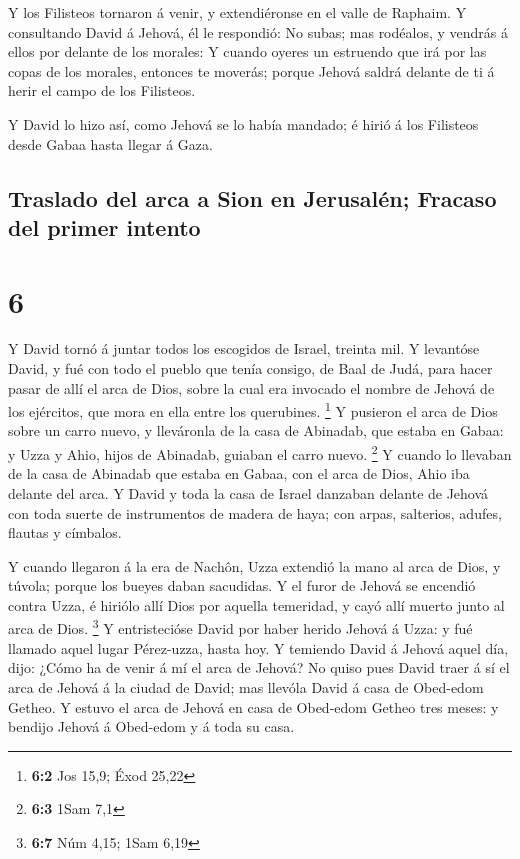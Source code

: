  Y los Filisteos tornaron á venir, y extendiéronse en el
valle de Raphaim.  Y consultando David á Jehová, él le
respondió: No subas; mas rodéalos, y vendrás á ellos por delante de los
morales:  Y cuando oyeres un estruendo que irá por las
copas de los morales, entonces te moverás; porque Jehová saldrá delante
de ti á herir el campo de los Filisteos.

 Y David lo hizo así, como Jehová se lo había mandado; é
hirió á los Filisteos desde Gabaa hasta llegar á Gaza.

\hypertarget{traslado-del-arca-a-sion-en-jerusaluxe9n-fracaso-del-primer-intento}{%
\subsection{Traslado del arca a Sion en Jerusalén; Fracaso del primer
intento}\label{traslado-del-arca-a-sion-en-jerusaluxe9n-fracaso-del-primer-intento}}

\hypertarget{section-5}{%
\section{6}\label{section-5}}

 Y David tornó á juntar todos los escogidos de Israel,
treinta mil.  Y levantóse David, y fué con todo el pueblo
que tenía consigo, de Baal de Judá, para hacer pasar de allí el arca de
Dios, sobre la cual era invocado el nombre de Jehová de los ejércitos,
que mora en ella entre los querubines. \footnote{\textbf{6:2} Jos 15,9;
  Éxod 25,22}  Y pusieron el arca de Dios sobre un carro
nuevo, y lleváronla de la casa de Abinadab, que estaba en Gabaa: y Uzza
y Ahio, hijos de Abinadab, guiaban el carro nuevo. \footnote{\textbf{6:3}
  1Sam 7,1}  Y cuando lo llevaban de la casa de Abinadab
que estaba en Gabaa, con el arca de Dios, Ahio iba delante del arca.
 Y David y toda la casa de Israel danzaban delante de
Jehová con toda suerte de instrumentos de madera de haya; con arpas,
salterios, adufes, flautas y címbalos.

 Y cuando llegaron á la era de Nachôn, Uzza extendió la
mano al arca de Dios, y túvola; porque los bueyes daban sacudidas.
 Y el furor de Jehová se encendió contra Uzza, é hiriólo
allí Dios por aquella temeridad, y cayó allí muerto junto al arca de
Dios. \footnote{\textbf{6:7} Núm 4,15; 1Sam 6,19}  Y
entristecióse David por haber herido Jehová á Uzza: y fué llamado aquel
lugar Pérez-uzza, hasta hoy.  Y temiendo David á Jehová
aquel día, dijo: ¿Cómo ha de venir á mí el arca de Jehová?
 No quiso pues David traer á sí el arca de Jehová á la
ciudad de David; mas llevóla David á casa de Obed-edom Getheo.
 Y estuvo el arca de Jehová en casa de Obed-edom Getheo
tres meses: y bendijo Jehová á Obed-edom y á toda su casa.

